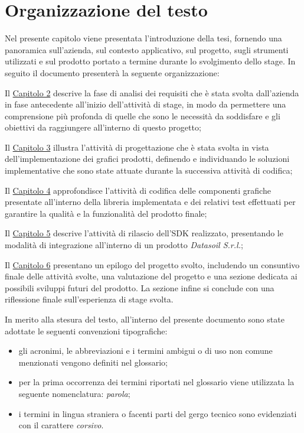 \section{Organizzazione del testo}
Nel presente capitolo viene presentata l'introduzione della tesi, fornendo una panoramica sull'azienda, sul contesto applicativo,
sul progetto, sugli strumenti utilizzati e sul prodotto portato a termine durante lo svolgimento dello stage. \newline
In seguito il documento presenterà la seguente organizzazione:

\begin{description}
      \item Il {\hyperref[chap:analisi-requisiti]{Capitolo 2}} descrive la fase di analisi dei requisiti che è stata
            svolta dall'azienda in fase antecedente all'inizio dell'attività di stage, in modo da permettere una comprensione più profonda
            di quelle che sono le necessità da soddisfare e gli obiettivi da raggiungere all'interno di questo progetto;

      \item Il {\hyperref[chap:progettazione]{Capitolo 3}} illustra l'attività di progettazione che è stata svolta in vista dell'implementazione
            dei grafici prodotti, definendo e individuando le soluzioni implementative che sono state attuate durante la successiva attività di codifica;

      \item Il {\hyperref[chap:realizzazione-testing]{Capitolo 4}} approfondisce l'attività di codifica delle componenti grafiche presentate
            all'interno della libreria implementata e dei relativi test effettuati per garantire la qualità e la funzionalità del prodotto finale;

      \item Il {\hyperref[chap:rilascio]{Capitolo 5}} descrive l'attività di rilascio dell'SDK realizzato, presentando le modalità di integrazione
            all'interno di un prodotto \textit{Datasoil S.r.l.};

      \item Il {\hyperref[chap:conclusioni]{Capitolo 6}} presentano un epilogo del progetto svolto, includendo un consuntivo finale delle attività svolte,
            una valutazione del progetto e una sezione dedicata ai possibili sviluppi futuri del prodotto.
            La sezione infine si conclude con una riflessione finale sull'esperienza di stage svolta.
\end{description}
In merito alla stesura del testo, all'interno del presente documento sono state adottate le seguenti convenzioni tipografiche:
\begin{itemize}
      \item gli acronimi, le abbreviazioni e i termini ambigui o di uso non comune menzionati vengono definiti nel glossario;
      \item per la prima occorrenza dei termini riportati nel glossario viene utilizzata la seguente nomenclatura: \textit{parola}\glox\gloxspacing;
      \item i termini in lingua straniera o facenti parti del gergo tecnico sono evidenziati con il carattere \textit{corsivo}.
\end{itemize}

